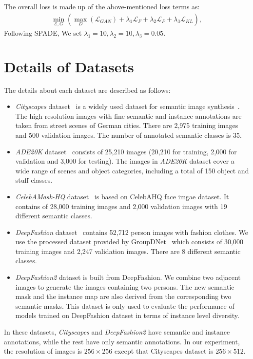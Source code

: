 \documentclass[final]{cvpr}
\begin{document}
The overall loss is made up of the above-mentioned loss terms as:
\begin{equation}
\begin{split}
    \min_{\mathcal{E}, G}(\max_{D}(\mathcal{L}_{GAN})+\lambda_{1} \mathcal{L}_{F}+ \lambda_{2} \mathcal{L}_{P}+\lambda_{3} \mathcal{L}_{KL}),
\end{split}
\end{equation}
Following SPADE, We set $\lambda_{1}=10, \lambda_{2}=10, \lambda_{3}=0.05$. 

\section{Details of Datasets}
The details about each dataset are described as follows:
\begin{itemize}
    \item \textit{Cityscapes} dataset~\cite{cordts2016cityscapes} is a widely used dataset for semantic image synthesis~\cite{wang2018video,qi2018semi,wang2018high}. The high-resolution images with fine semantic and instance annotations are taken from street scenes of German cities. There are 2,975 training images and 500 validation images. The number of annotated semantic classes is 35. 
    \item \textit{ADE20K} dataset~\cite{zhou2017scene} consists of 25,210 images (20,210 for training, 2,000 for validation and 3,000 for testing). The images in \textit{ADE20K} dataset cover a wide range of scenes and object categories, including a total of 150 object and stuff classes. 
    \item \textit{CelebAMask-HQ} dataset~\cite{lee2020maskgan,karras2017progressive,liu2015deep} is based on CelebAHQ face imgae dataset. It contains of 28,000 training images and 2,000 validation images with 19 different semantic classes. 
    \item \textit{DeepFashion} dataset~\cite{liu2016deepfashion} contains 52,712 person images with fashion clothes. We use the processed dataset provided by GroupDNet~\cite{zhu2020semantically} which consists of 30,000 training images and 2,247 validation images. There are 8 different semantic classes.
    \item \textit{DeepFashion2} dataset is built from DeepFashion. We combine two adjacent images to generate the images containing two persons. The new semantic mask and the instance map are also derived from the corresponding two semantic masks. This dataset is only used to evaluate the performance of models trained on DeepFashion dataset in terms of instance level diversity.
\end{itemize}
In these datasets, \textit{Cityscapes} and \textit{DeepFashion2} have semantic and instance annotations, while the rest have only semantic annotations. In our experiment, the resolution of images is $256\times 256$ except that Cityscapes dataset is $256\times 512$.
\end{document}
